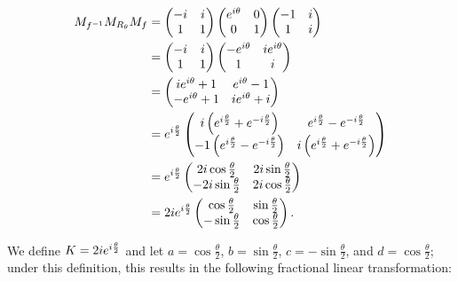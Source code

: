 \begin{solution}
  \begin{align*}
    M_{f^{-1}} M_{R_\theta} M_f &= \begin{pmatrix}
      -i & i \\
       1 & 1
    \end{pmatrix} \begin{pmatrix}
      e^{i \theta} & 0 \\
      0            & 1
    \end{pmatrix} \begin{pmatrix}
      -1 & i \\
       1 & i
    \end{pmatrix} \\
    &= \begin{pmatrix}
      -i & i \\
       1 & 1
    \end{pmatrix} \begin{pmatrix}
      -e^{i \theta} & ie^{i \theta} \\
       1            & i
    \end{pmatrix} \\
    &= \begin{pmatrix}
      i e^{i \theta} + 1 &  e^{i \theta} - 1 \\
       -e^{i \theta} + 1 & ie^{i \theta} + i
    \end{pmatrix} \\
    &= \hangle \begin{pmatrix}
       i \left(\hangle + \hangle[-] \right) & \hangle - \hangle[-] \\
      -1 \left(\hangle - \hangle[-] \right) & i \left(\hangle + \hangle[-]\right)
    \end{pmatrix} \\
    &= \hangle \begin{pmatrix}
       2i \cos{\frac{\theta}{2}} & 2i \sin{\frac{\theta}{2}} \\
      -2i \sin{\frac{\theta}{2}} & 2i \cos{\frac{\theta}{2}}
    \end{pmatrix} \\
    &= 2i \hangle \begin{pmatrix}
       \cos{\frac{\theta}{2}} & \sin{\frac{\theta}{2}} \\
      -\sin{\frac{\theta}{2}} & \cos{\frac{\theta}{2}}
    \end{pmatrix}.
  \end{align*}

  We define $K = 2 i \hangle$ and let $a = \cos{\frac{\theta}{2}}$, $b = \sin{\frac{\theta}{2}}$, 
  $c = -\sin{\frac{\theta}{2}}$, and $d = \cos{\frac{\theta}{2}}$; under this definition, this results in the following 
  fractional linear transformation:


\end{solution}
